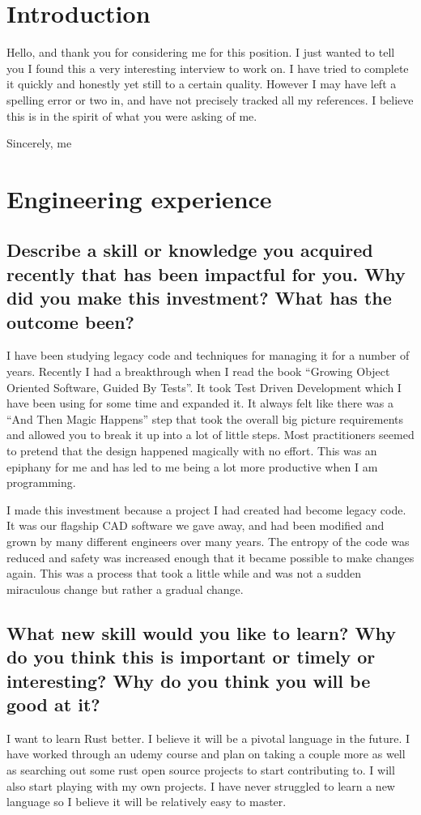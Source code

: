 \documentclass[letter,12pt]{article}
\begin{document}
\section{Introduction}
Hello, and thank you for considering me for this position. I just wanted to tell you I found this a very interesting interview to work on. I have tried to complete it quickly and honestly yet still to a certain quality. However I may have left a spelling error or two in, and have not precisely tracked all my references. I believe this is in the spirit of what you were asking of me.

Sincerely, me

\section{Engineering experience}

\subsection{Describe a skill or knowledge you acquired recently that has been impactful for you. Why did you make this investment? What has the outcome been?}
I have been studying legacy code and techniques for managing it for a number of years. Recently I had a breakthrough when I read the book ``Growing Object Oriented Software, Guided By Tests''. It took Test Driven Development which I have been using for some time and expanded it. It always felt like there was a ``And Then Magic Happens'' step that took the overall big picture requirements and allowed you to break it up into a lot of little steps. Most practitioners seemed to pretend that the design happened magically with no effort. This was an epiphany for me and has led to me being a lot more productive when I am programming.

I made this investment because a project I had created had become legacy code. It was our flagship CAD software we gave away, and had been modified and grown by many different engineers over many years. The entropy of the code was reduced and safety was increased enough that it became possible to make changes again. This was a process that took a little while and was not a sudden miraculous change but rather a gradual change.

\subsection{What new skill would you like to learn? Why do you think this is important or timely or interesting? Why do you think you will be good at it?}
I want to learn Rust better. I believe it will be a pivotal language in the future. I have worked through an udemy course and plan on taking a couple more as well as searching out some rust open source projects to start contributing to. I will also start playing with my own projects. I have never struggled to learn a new language so I believe it will be relatively easy to master.
\end{document}
